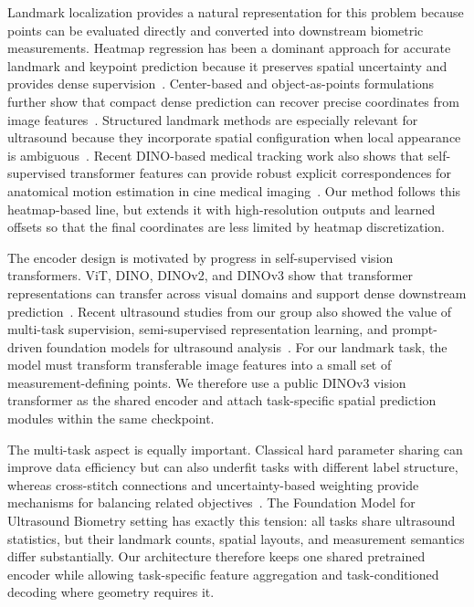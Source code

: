 \documentclass[runningheads]{llncs}
\begin{document}
Landmark localization provides a natural representation for this problem because points can be evaluated directly and converted into downstream biometric measurements. Heatmap regression has been a dominant approach for accurate landmark and keypoint prediction because it preserves spatial uncertainty and provides dense supervision~\cite{payer2016regressing,newell2016hourglass,sun2019hrnet}. Center-based and object-as-points formulations further show that compact dense prediction can recover precise coordinates from image features~\cite{zhou2019objects}. Structured landmark methods are especially relevant for ultrasound because they incorporate spatial configuration when local appearance is ambiguous~\cite{payer2019integrating}. Recent DINO-based medical tracking work also shows that self-supervised transformer features can provide robust explicit correspondences for anatomical motion estimation in cine medical imaging~\cite{salari2025dinomotion}. Our method follows this heatmap-based line, but extends it with high-resolution outputs and learned offsets so that the final coordinates are less limited by heatmap discretization.

The encoder design is motivated by progress in self-supervised vision transformers. ViT, DINO, DINOv2, and DINOv3 show that transformer representations can transfer across visual domains and support dense downstream prediction~\cite{dosovitskiy2021vit,caron2021dino,oquab2024dinov2,simeoni2025dinov3}. Recent ultrasound studies from our group also showed the value of multi-task supervision, semi-supervised representation learning, and prompt-driven foundation models for ultrasound analysis~\cite{behboodi2021breast,rasaee2025sarcopenia,rasaee2025grounding}. For our landmark task, the model must transform transferable image features into a small set of measurement-defining points. We therefore use a public DINOv3 vision transformer as the shared encoder and attach task-specific spatial prediction modules within the same checkpoint.

The multi-task aspect is equally important. Classical hard parameter sharing can improve data efficiency but can also underfit tasks with different label structure, whereas cross-stitch connections and uncertainty-based weighting provide mechanisms for balancing related objectives~\cite{caruana1997,misra2016crossstitch,kendall2018multitask}. The Foundation Model for Ultrasound Biometry setting has exactly this tension: all tasks share ultrasound statistics, but their landmark counts, spatial layouts, and measurement semantics differ substantially. Our architecture therefore keeps one shared pretrained encoder while allowing task-specific feature aggregation and task-conditioned decoding where geometry requires it.
\end{document}
